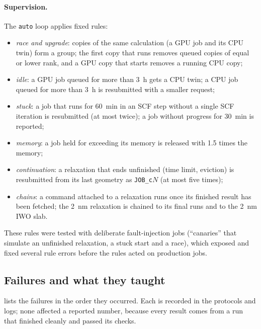 \paragraph{Supervision.} The \texttt{auto} loop applies fixed rules:
\begin{itemize}
\item \emph{race and upgrade}: copies of the same calculation (a GPU job and its CPU twin) form a group; the first copy
that runs removes queued copies of equal or lower rank, and a GPU copy that starts removes a running CPU copy;
\item \emph{idle}: a GPU job queued for more than 3~h gets a CPU twin; a CPU job queued for more than 3~h is resubmitted
with a smaller request;
\item \emph{stuck}: a job that runs for 60~min in an SCF step without a single SCF iteration is resubmitted (at most
twice); a job without progress for 30~min is reported;
\item \emph{memory}: a job held for exceeding its memory is released with 1.5 times the memory;
\item \emph{continuation}: a relaxation that ends unfinished (time limit, eviction) is resubmitted from its last
geometry as \texttt{JOB\_c}$N$ (at most five times);
\item \emph{chains}: a command attached to a relaxation runs once its finished result has been fetched; the 2~nm
relaxation is chained to its final runs and to the 2~nm IWO slab.
\end{itemize}
These rules were tested with deliberate fault-injection jobs (``canaries'' that simulate an unfinished relaxation, a
stuck start and a race), which exposed and fixed several rule errors before the rules acted on production jobs.

\subsection{Failures and what they taught}
\label{sec:dft-failures}

 lists the failures in the order they occurred. Each is recorded in the protocols and logs; none
affected a reported number, because every result comes from a run that finished cleanly and passed its checks.


